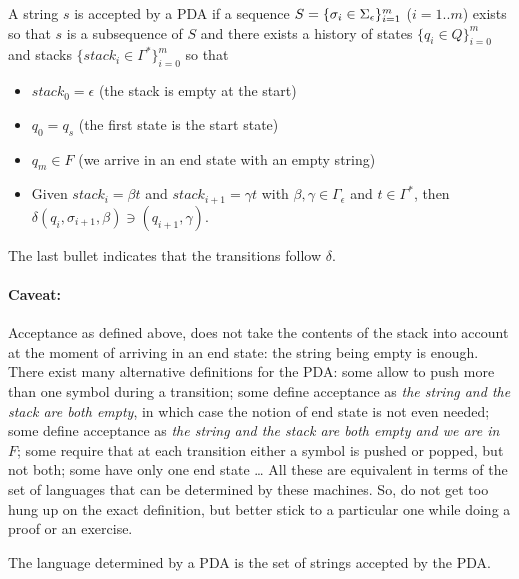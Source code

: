 \begin{definition}
A string $s$ is accepted by a PDA if a sequence $S = \{\sigma_i\in \Sigma_{\epsilon}\}_{i=1}^m$ ($i = 1 .. m$) exists so that $s$ is a subsequence of $S$ and there exists a history of states $\{q_i\in Q\}_{i=0}^m$ and stacks $\{stack_i\in\Gamma^*\}_{i=0}^m$ so that
\begin{itemize}
	\item $stack_0 = \epsilon$  (the stack is empty at the start)
	\item $q_0 = q_s$ (the first state is the start state)
	\item $q_m \in F$ (we arrive in an end state with an empty string)
	\item Given $stack_i = \beta t$ and $stack_{i+1} = \gamma t$ with $\beta,\gamma \in
\Gamma_\epsilon$ and $t \in \Gamma^*$, then \\
	$\delta(q_i,\sigma_{i+1},\beta) \ni (q_{i+1},\gamma)$.
\end{itemize}
\end{definition}
The last bullet indicates that the transitions follow $\delta$.

\paragraph{Caveat:}

Acceptance as defined above, does not take the contents of the stack
into account at the moment of arriving in an end state: the string
being empty is enough. There exist many alternative definitions for
the PDA: some allow to push more than one symbol during a transition;
some define acceptance as {\em the string and the stack are both
  empty}, in which case the notion of end state is not even needed;
some define acceptance as {\em the string and the stack are both empty
  and we are in $F$}; some require that at each transition either a
symbol is pushed or popped, but not both; some have only one end state
\ldots{} All these are equivalent in terms of the set of languages that can
be determined by these machines. So, do not get too hung up on the
exact definition, but better stick to a particular one while doing a
proof or an exercise.


\begin{definition}
The language determined by a PDA is the set of strings accepted by the
PDA.
\end{definition}

